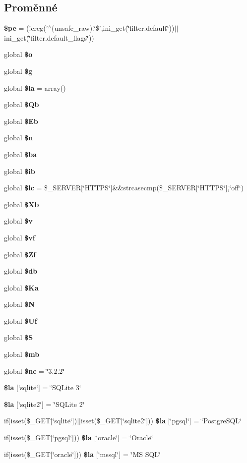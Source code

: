 \subsection*{Proměnné}
\begin{DoxyCompactItemize}
\item 
{\bf \$pe} = (!ereg('$^\wedge$(unsafe\_\-raw)?\$',ini\_\-get(\char`\"{}filter.default\char`\"{}))$|$$|$ini\_\-get(\char`\"{}filter.default\_\-flags\char`\"{}))
\item 
global {\bf \$o}
\item 
global {\bf \$g}
\item 
global {\bf \$la} = array()
\item 
global {\bf \$Qb}
\item 
global {\bf \$Eb}
\item 
global {\bf \$n}
\item 
global {\bf \$ba}
\item 
global {\bf \$ib}
\item 
global {\bf \$lc} = \$\_\-SERVER[\char`\"{}HTTPS\char`\"{}]\&\&strcasecmp(\$\_\-SERVER[\char`\"{}HTTPS\char`\"{}],\char`\"{}off\char`\"{})
\item 
global {\bf \$Xb}
\item 
global {\bf \$v}
\item 
global {\bf \$vf}
\item 
global {\bf \$Zf}
\item 
global {\bf \$db}
\item 
global {\bf \$Ka}
\item 
global {\bf \$N}
\item 
global {\bf \$Uf}
\item 
global {\bf \$S}
\item 
global {\bf \$mb}
\item 
global {\bf \$nc} = \char`\"{}3.2.2\char`\"{}
\item 
{\bf \$la} [\char`\"{}sqlite\char`\"{}] = \char`\"{}SQLite 3\char`\"{}
\item 
{\bf \$la} [\char`\"{}sqlite2\char`\"{}] = \char`\"{}SQLite 2\char`\"{}
\item 
if(isset(\$\_\-GET[\char`\"{}sqlite\char`\"{}])$|$$|$isset(\$\_\-GET[\char`\"{}sqlite2\char`\"{}])) {\bf \$la} [\char`\"{}pgsql\char`\"{}] = \char`\"{}PostgreSQL\char`\"{}
\item 
if(isset(\$\_\-GET[\char`\"{}pgsql\char`\"{}])) {\bf \$la} [\char`\"{}oracle\char`\"{}] = \char`\"{}Oracle\char`\"{}
\item 
if(isset(\$\_\-GET[\char`\"{}oracle\char`\"{}])) {\bf \$la} [\char`\"{}mssql\char`\"{}] = \char`\"{}MS SQL\char`\"{}
\end{DoxyCompactItemize}


